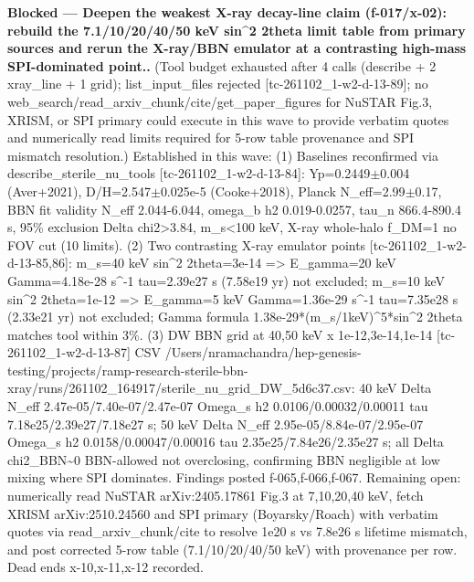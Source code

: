 \documentclass[11pt,a4paper]{article}
\begin{document}
\textbf{Blocked --- Deepen the weakest X-ray decay-line claim (f-017/x-02): rebuild the 7.1/10/20/40/50 keV sin\textasciicircum{}2 2theta limit table from primary sources and rerun the X-ray/BBN emulator at a contrasting high-mass SPI-dominated point..} (Tool budget exhausted after 4 calls (describe + 2 xray\_line + 1 grid); list\_input\_files rejected [tc-261102\_1-w2-d-13-89]; no web\_search/read\_arxiv\_chunk/cite/get\_paper\_figures for NuSTAR Fig.3, XRISM, or SPI primary could execute in this wave to provide verbatim quotes and numerically read limits required for 5-row table provenance and SPI mismatch resolution.) Established in this wave: (1) Baselines reconfirmed via describe\_sterile\_nu\_tools [tc-261102\_1-w2-d-13-84]: Yp=0.2449$\pm$0.004 (Aver+2021), D/H=2.547$\pm$0.025e-5 (Cooke+2018), Planck N\_eff=2.99$\pm$0.17, BBN fit validity N\_eff 2.044-6.044, omega\_b h2 0.019-0.0257, tau\_n 866.4-890.4 s, 95\% exclusion Delta chi2\textgreater{}3.84, m\_s\textless{}100 keV, X-ray whole-halo f\_DM=1 no FOV cut (10 limits). (2) Two contrasting X-ray emulator points [tc-261102\_1-w2-d-13-85,86]: m\_s=40 keV sin\textasciicircum{}2 2theta=3e-14 =\textgreater{} E\_gamma=20 keV Gamma=4.18e-28 s\textasciicircum{}-1 tau=2.39e27 s (7.58e19 yr) not excluded; m\_s=10 keV sin\textasciicircum{}2 2theta=1e-12 =\textgreater{} E\_gamma=5 keV Gamma=1.36e-29 s\textasciicircum{}-1 tau=7.35e28 s (2.33e21 yr) not excluded; Gamma formula 1.38e-29*(m\_s/1keV)\textasciicircum{}5*sin\textasciicircum{}2 2theta matches tool within 3\%. (3) DW BBN grid at 40,50 keV x 1e-12,3e-14,1e-14 [tc-261102\_1-w2-d-13-87] CSV /Users/nramachandra/hep-genesis-testing/projects/ramp-research-sterile-bbn-xray/runs/261102\_164917/sterile\_nu\_grid\_DW\_5d6c37.csv: 40 keV Delta N\_eff 2.47e-05/7.40e-07/2.47e-07 Omega\_s h2 0.0106/0.00032/0.00011 tau 7.18e25/2.39e27/7.18e27 s; 50 keV Delta N\_eff 2.95e-05/8.84e-07/2.95e-07 Omega\_s h2 0.0158/0.00047/0.00016 tau 2.35e25/7.84e26/2.35e27 s; all Delta chi2\_BBN\textasciitilde{}0 BBN-allowed not overclosing, confirming BBN negligible at low mixing where SPI dominates. Findings posted f-065,f-066,f-067. Remaining open: numerically read NuSTAR arXiv:2405.17861 Fig.3 at 7,10,20,40 keV, fetch XRISM arXiv:2510.24560 and SPI primary (Boyarsky/Roach) with verbatim quotes via read\_arxiv\_chunk/cite to resolve 1e20 s vs 7.8e26 s lifetime mismatch, and post corrected 5-row table (7.1/10/20/40/50 keV) with provenance per row. Dead ends x-10,x-11,x-12 recorded.
\end{document}
